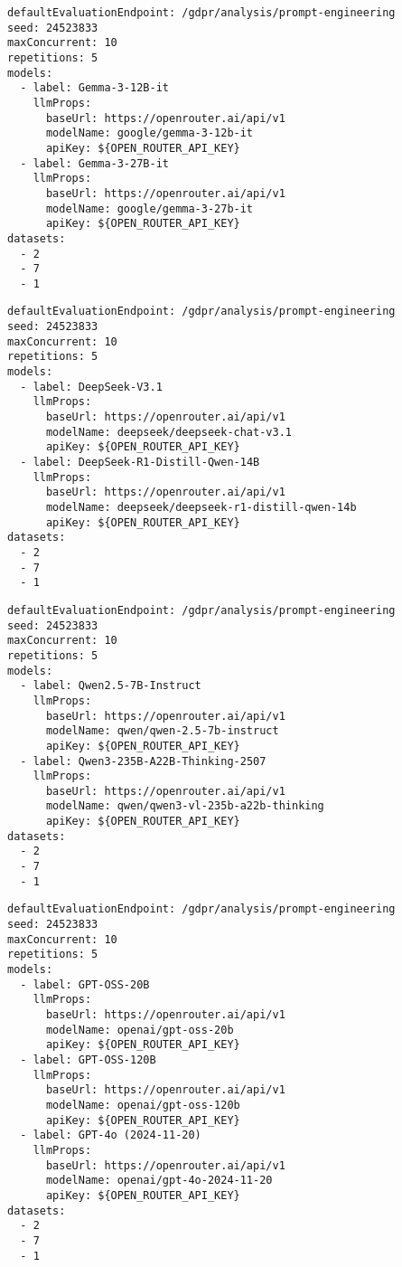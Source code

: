 \begin{lstlisting}[caption={Konfigurationsdatei des Experiments mit Gemma Modellen}, label={lst:gemma-experiment-config}]
defaultEvaluationEndpoint: /gdpr/analysis/prompt-engineering
seed: 24523833
maxConcurrent: 10
repetitions: 5
models:
  - label: Gemma-3-12B-it
    llmProps:
      baseUrl: https://openrouter.ai/api/v1
      modelName: google/gemma-3-12b-it
      apiKey: ${OPEN_ROUTER_API_KEY}
  - label: Gemma-3-27B-it
    llmProps:
      baseUrl: https://openrouter.ai/api/v1
      modelName: google/gemma-3-27b-it
      apiKey: ${OPEN_ROUTER_API_KEY}
datasets:
  - 2
  - 7
  - 1
\end{lstlisting}

\begin{lstlisting}[caption={Konfigurationsdatei des Experiments mit DeepSeek Modellen}, label={lst:deepseek-experiment-config}]
defaultEvaluationEndpoint: /gdpr/analysis/prompt-engineering
seed: 24523833
maxConcurrent: 10
repetitions: 5
models:
  - label: DeepSeek-V3.1
    llmProps:
      baseUrl: https://openrouter.ai/api/v1
      modelName: deepseek/deepseek-chat-v3.1
      apiKey: ${OPEN_ROUTER_API_KEY}
  - label: DeepSeek-R1-Distill-Qwen-14B
    llmProps:
      baseUrl: https://openrouter.ai/api/v1
      modelName: deepseek/deepseek-r1-distill-qwen-14b
      apiKey: ${OPEN_ROUTER_API_KEY}
datasets:
  - 2
  - 7
  - 1
\end{lstlisting}

\begin{lstlisting}[caption={Konfigurationsdatei des Experiments mit Qwen Modellen}, label={lst:qwen-experiment-config}]
defaultEvaluationEndpoint: /gdpr/analysis/prompt-engineering
seed: 24523833
maxConcurrent: 10
repetitions: 5
models:
  - label: Qwen2.5-7B-Instruct
    llmProps:
      baseUrl: https://openrouter.ai/api/v1
      modelName: qwen/qwen-2.5-7b-instruct
      apiKey: ${OPEN_ROUTER_API_KEY}
  - label: Qwen3-235B-A22B-Thinking-2507
    llmProps:
      baseUrl: https://openrouter.ai/api/v1
      modelName: qwen/qwen3-vl-235b-a22b-thinking
      apiKey: ${OPEN_ROUTER_API_KEY}
datasets:
  - 2
  - 7
  - 1
\end{lstlisting}

\begin{lstlisting}[caption={Konfigurationsdatei des Experiments mit GPT Modellen}, label={lst:gpt-experiment-config}]
defaultEvaluationEndpoint: /gdpr/analysis/prompt-engineering
seed: 24523833
maxConcurrent: 10
repetitions: 5
models:
  - label: GPT-OSS-20B
    llmProps:
      baseUrl: https://openrouter.ai/api/v1
      modelName: openai/gpt-oss-20b
      apiKey: ${OPEN_ROUTER_API_KEY}
  - label: GPT-OSS-120B
    llmProps:
      baseUrl: https://openrouter.ai/api/v1
      modelName: openai/gpt-oss-120b
      apiKey: ${OPEN_ROUTER_API_KEY}
  - label: GPT-4o (2024-11-20)
    llmProps:
      baseUrl: https://openrouter.ai/api/v1
      modelName: openai/gpt-4o-2024-11-20
      apiKey: ${OPEN_ROUTER_API_KEY}
datasets:
  - 2
  - 7
  - 1
\end{lstlisting}
